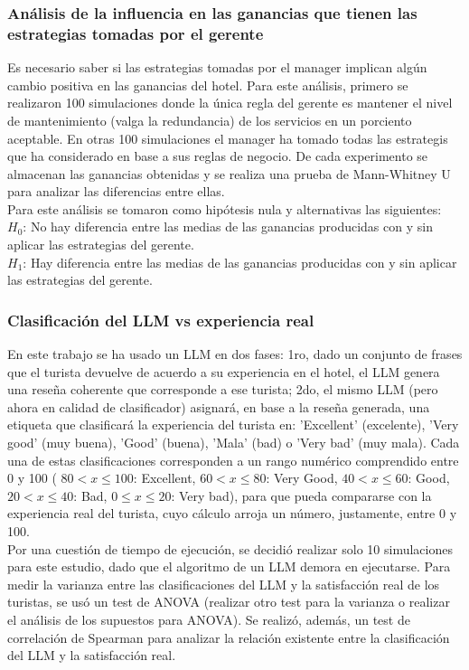 \documentclass[12pt,a4paper]{article} \usepackage[spanish]{babel} \usepackage{graphicx} \usepackage{amsmath} \usepackage{amsfonts} \usepackage{amssymb} \usepackage{float} \usepackage{geometry}
\begin{document}
\subsubsection{Análisis de la influencia en las ganancias que tienen las estrategias tomadas por el gerente}
Es necesario saber si las estrategias tomadas por el manager implican algún cambio positiva en las ganancias del hotel. Para este análisis, primero se realizaron 100 simulaciones donde la única regla del gerente es mantener el nivel de mantenimiento (valga la redundancia) de los servicios en un porciento aceptable. En otras 100 simulaciones el manager ha tomado todas las estrategis que ha considerado en base a sus reglas de negocio. De cada experimento se almacenan las ganancias obtenidas y se realiza una prueba de Mann-Whitney U para analizar las diferencias entre ellas.\\
Para este análisis se tomaron como hipótesis nula y alternativas las siguientes:\\
$H_0$: No hay diferencia entre las medias de las ganancias producidas con y sin aplicar las estrategias del gerente.\\
$H_1$: Hay diferencia entre las medias de las ganancias producidas con y sin aplicar las estrategias del gerente.\\
\subsubsection{Clasificación del LLM vs experiencia real}
En este trabajo se ha usado un LLM en dos fases: 1ro, dado un conjunto de frases que el turista devuelve de acuerdo a su experiencia en el hotel, el LLM genera una reseña coherente que corresponde a ese turista; 2do, el mismo LLM (pero ahora en calidad de clasificador) asignará, en base a la reseña generada, una etiqueta que clasificará la experiencia del turista en: 'Excellent' (excelente), 'Very good' (muy buena), 'Good' (buena), 'Mala' (bad) o 'Very bad' (muy mala). Cada una de estas clasificaciones corresponden a un rango numérico comprendido entre 0 y 100 ( $80 < x \le 100$: Excellent, $60 < x \le 80$: Very Good, $40 < x \le 60$: Good, $20 < x \le 40$: Bad, $0 \le x \le 20$: Very bad), para que pueda compararse con la experiencia real del turista, cuyo cálculo arroja un número, justamente, entre 0 y 100.\\
Por una cuestión de tiempo de ejecución, se decidió realizar solo 10 simulaciones para este estudio, dado que el algoritmo de un LLM demora en ejecutarse. Para medir la varianza entre las clasificaciones del LLM y la satisfacción real de los turistas, se usó un test de ANOVA (realizar otro test para la varianza o realizar el análisis de los supuestos para ANOVA). Se realizó, además, un test de correlación de Spearman para analizar la relación existente entre la clasificación del LLM y la satisfacción real.
\end{document}

